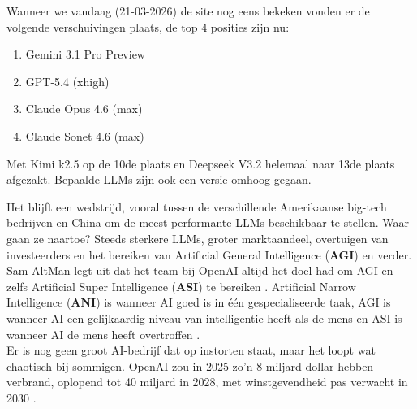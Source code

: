 Wanneer we vandaag (21-03-2026) de site nog eens bekeken vonden er de volgende verschuivingen plaats, de top 4 posities zijn nu: \\

\begin{enumerate}
    \item Gemini 3.1 Pro Preview
    \item GPT-5.4 (xhigh)
    \item Claude Opus 4.6 (max)
    \item Claude Sonet 4.6 (max)
\end{enumerate} 

Met Kimi k2.5 op de 10de plaats en Deepseek V3.2 helemaal naar 13de plaats afgezakt. Bepaalde LLMs zijn ook een versie omhoog gegaan. \\

Het blijft een wedstrijd, vooral tussen de verschillende Amerikaanse big-tech bedrijven en China om de meest performante LLMs beschikbaar te stellen. Waar gaan ze naartoe? Steeds sterkere LLMs, groter marktaandeel, overtuigen van investeerders en het bereiken van Artificial General Intelligence (\textbf{AGI}) en verder. Sam AltMan legt uit dat het team bij OpenAI altijd het doel had om AGI en zelfs Artificial Super Intelligence (\textbf{ASI}) te bereiken \autocite{Tan2024a}. Artificial Narrow Intelligence (\textbf{ANI}) is wanneer AI goed is in één gespecialiseerde taak, AGI is wanneer AI een gelijkaardig niveau van intelligentie heeft als de mens en ASI is wanneer AI de mens heeft overtroffen \autocite{IBMf}. \\

Er is nog geen groot AI-bedrijf dat op instorten staat, maar het loopt wat chaotisch bij sommigen. OpenAI zou in 2025 zo'n 8 miljard dollar hebben verbrand, oplopend tot 40 miljard in 2028, met winstgevendheid pas verwacht in 2030 \autocite{Ferreira2026}. \\

